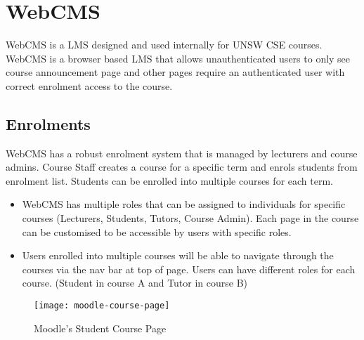 \chapter{WebCMS}\label{ch:style}

WebCMS is a LMS designed and used internally for UNSW CSE courses. WebCMS is a browser based LMS that allows unauthenticated users to only see course announcement page and other pages require an authenticated user with correct enrolment access to the course.

\section{Enrolments}
WebCMS has a robust enrolment system that is managed by lecturers and course admins. Course Staff creates a course for a specific term and enrols students from enrolment list. Students can be enrolled into multiple courses for each term.
\begin{itemize}
\item WebCMS has multiple roles that can be assigned to individuals for specific courses (Lecturers, Students, Tutors, Course Admin). Each page in the course can be customised to be accessible by users with specific roles.
\item Users enrolled into multiple courses will be able to navigate through the courses via the nav bar at top of page. Users can have different roles for each course. (Student in course A and Tutor in course B)
\end{itemize}

\newpage

\begin{figure}[h!]
    \centering
    \texttt{[image: moodle-course-page]}
    \caption{Moodle's Student Course Page}
\end{figure}

